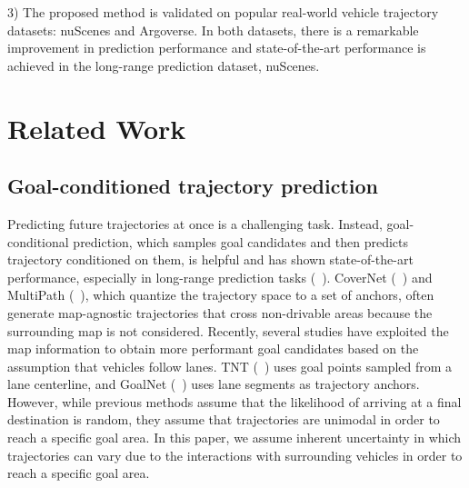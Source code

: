 \documentclass{article} \usepackage{iclr2023_conference,times}
\begin{document}
3) The proposed method is validated on popular real-world vehicle trajectory datasets: nuScenes and Argoverse. 
In both datasets, there is a remarkable improvement in prediction performance and state-of-the-art performance is achieved in the long-range prediction dataset, nuScenes.

\section{Related Work}
\subsection{Goal-conditioned trajectory prediction}
Predicting future trajectories at once is a challenging task.
Instead, goal-conditional prediction, which samples goal candidates and then predicts trajectory conditioned on them, is helpful and has shown state-of-the-art performance, especially in long-range prediction tasks (~\cite{zhao2021tnt,gu2021densetnt,phan2020covernet,chai2020multipath,zhang2021map}).
CoverNet (~\cite{phan2020covernet}) and MultiPath (~\cite{chai2020multipath}), which quantize the trajectory space to a set of anchors, often generate map-agnostic trajectories that cross non-drivable areas because the surrounding map is not considered.
Recently, several studies have exploited the map information to obtain more performant goal candidates based on the assumption that vehicles follow lanes.
TNT (~\cite{zhao2021tnt}) uses goal points sampled from a lane centerline, and GoalNet (~\cite{zhang2021map}) uses lane segments as trajectory anchors.
However, while previous methods assume that the likelihood of arriving at a final destination is random, they assume that trajectories are unimodal in order to reach a specific goal area. 
In this paper, we assume inherent uncertainty in which trajectories can vary due to the interactions with surrounding vehicles in order to reach a specific goal area.
\end{document}
